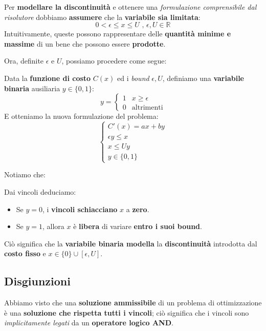 Per \textbf{modellare la discontinuità} e ottenere una 
\textit{formulazione comprensibile dal risolutore} dobbiamo
\textbf{assumere} che la \textbf{variabile sia limitata}:
\[
    0 < \epsilon \le x \le U \text{ , }\epsilon,U \in \mathbb{R}
\]
Intuitivamente, queste possono rappresentare delle \textbf{quantità minime e massime}
di un bene che possono essere \textbf{prodotte}.

Ora, definite $\epsilon$ e $U$, possiamo procedere come segue:

\begin{definition}
    Data la \textbf{funzione di costo} $C(x)$ ed i \textit{bound} $\epsilon,U$, 
    definiamo una \textbf{variabile binaria} ausiliaria $y\in \{0,1\}$:
    \[
        y = \begin{cases}
            1 & x\ge \epsilon \\ 
            0 & \text{altrimenti}
        \end{cases}
    \] 
    E otteniamo la nuova formulazione del problema:
    \[
        \begin{cases}
            C'(x) = ax + by \\ 
            \epsilon y \le x \\ 
            x \le Uy \\ 
            y \in \{0,1\}  
        \end{cases}
    \] 
\end{definition}

Notiamo che:

\begin{remark}
    Dai vincoli deduciamo:
    \begin{itemize}
        \item Se $y=0$, i \textbf{vincoli schiacciano} $x$ a \textbf{zero}.
        \item Se $y=1$, allora $x$ è \textbf{libera} di variare
            \textbf{entro i suoi bound}.
    \end{itemize}
    Ciò significa che la \textbf{variabile binaria modella} la \textbf{discontinuità} 
    introdotta dal \textbf{costo fisso} e $x\in \{0\} \cup [\epsilon, U]$.
\end{remark}

\subsection{Disgiunzioni}

Abbiamo visto che una \textbf{soluzione ammissibile} di un problema di ottimizzazione
è una \textbf{soluzione che rispetta tutti i vincoli}; ciò significa che i vincoli
sono \textit{implicitamente legati} da un \textbf{operatore logico AND}.

